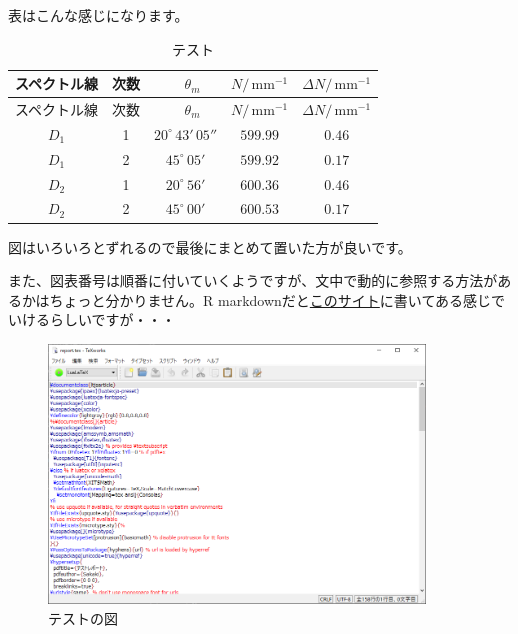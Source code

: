 \documentclass{ltjsarticle}
\begin{document}
表はこんな感じになります。

\begin{longtable}[]{@{}ccccc@{}}
\caption{テスト}\tabularnewline
\toprule
スペクトル線 & 次数 & 　\(\theta_m\)　 & \(N / \,\mathrm{mm^{-1}}\) &
\(\Delta N / \,\mathrm{mm^{-1}}\)\tabularnewline
\midrule
\endfirsthead
\toprule
スペクトル線 & 次数 & 　\(\theta_m\)　 & \(N / \,\mathrm{mm^{-1}}\) &
\(\Delta N / \,\mathrm{mm^{-1}}\)\tabularnewline
\midrule
\endhead
\(D_1\) & 1 & \(20^{\circ}\,43'\,05''\) & \(599.99\) &
\(0.46\)\tabularnewline
\(D_1\) & 2 & \(45^{\circ}\,05'\) & \(599.92\) & \(0.17\)\tabularnewline
\(D_2\) & 1 & \(20^{\circ}\,56'\) & \(600.36\) & \(0.46\)\tabularnewline
\(D_2\) & 2 & \(45^{\circ}\,00'\) & \(600.53\) & \(0.17\)\tabularnewline
\bottomrule
\end{longtable}

図はいろいろとずれるので最後にまとめて置いた方が良いです。

また、図表番号は順番に付いていくようですが、文中で動的に参照する方法があるかはちょっと分かりません。R
markdownだと\href{https://rmarkdown.rstudio.com/authoring_basics.html}{このサイト}に書いてある感じでいけるらしいですが・・・

\begin{figure}
\centering
\includegraphics[width=10cm,height=\textheight]{fig1.png}
\caption{テストの図}
\end{figure}
\end{document}
